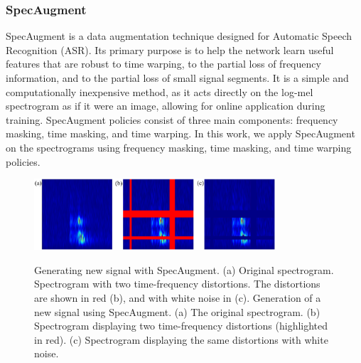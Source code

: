 \documentclass[journal]{IEEEtran}
\begin{document}
\subsubsection{SpecAugment}
SpecAugment is a data augmentation technique designed for Automatic Speech Recognition (ASR). Its primary purpose is to help the network learn useful features that are robust to time warping, to the partial loss of frequency information, and to the partial loss of small signal segments. It is a simple and computationally inexpensive method, as it acts directly on the log-mel spectrogram as if it were an image, allowing for online application during training\cite{park2019specaugment}.
SpecAugment policies consist of three main components: frequency masking, time masking, and time warping\cite{park2020specaugment,soni2024generalized}.
In this work, we apply SpecAugment on the spectrograms using frequency masking, time masking, and time warping policies.
\begin{figure}
\centering
{\includegraphics[width=0.8\textwidth,keepaspectratio]{img/da_specaugment.png}}
\caption{Generating new signal with SpecAugment. (a) Original spectrogram. Spectrogram with two time-frequency distortions. The distortions are shown in red (b), and with white noise in (c).
Generation of a new signal using SpecAugment. (a) The original spectrogram. (b) Spectrogram displaying two time-frequency distortions (highlighted in red). (c) Spectrogram displaying the same distortions with white noise.}
\label{fig:da_specaugment}
\end{figure}
\end{document}
